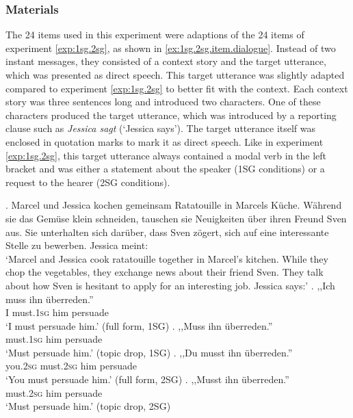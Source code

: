 \subsubsection{Materials}
The 24 items used in this experiment were adaptions of the 24 items of experiment \ref*{exp:1sg.2sg}, as shown in \ref{ex:1sg.2sg.item.dialogue}.
Instead of two instant messages, they consisted of a context story and the target utterance, which was presented as direct speech.
This target utterance was slightly adapted compared to experiment \ref*{exp:1sg.2sg} to better fit with the context.
Each context story was three sentences long and introduced two characters.
One of these characters produced the target utterance, which was introduced by a reporting clause such as \textit{Jessica sagt} (`Jessica says'). 
The target utterance itself was enclosed in quotation marks to mark it as direct speech.
Like in experiment \ref*{exp:1sg.2sg}, this target utterance always contained a modal verb in the left bracket and was either a statement about the speaker (1SG conditions) or a request to the hearer (2SG conditions).

\sloppy
\ex.\label{ex:1sg.2sg.item.dialogue}
Marcel und Jessica kochen gemeinsam Ratatouille in Marcels Küche. Während sie das Gemüse klein schneiden, tauschen sie Neuigkeiten über ihren Freund Sven aus. Sie unterhalten sich darüber, dass Sven zögert, sich auf eine interessante Stelle zu bewerben.	Jessica meint:
\\
`Marcel and Jessica cook ratatouille together in Marcel's kitchen. While they chop the vegetables, they exchange news about their friend Sven. They talk about how Sven is hesitant to apply for an interesting job. Jessica says:'
\ag. ,,Ich muss ihn überreden.''\\
I must.\textsc{1sg} him persuade\\
`I must persuade him.' \hfill (full form, 1SG)
\bg. ,,Muss ihn überreden.''\\
must.\textsc{1sg} him persuade\\
`Must persuade him.' \hfill (topic drop, 1SG)
\cg. ,,Du musst ihn überreden.''\\
you.\textsc{2sg} must.\textsc{2sg} him persuade\\
`You must persuade him.' \hfill (full form, 2SG)
\dg. ,,Musst ihn überreden.''\\
must.\textsc{2sg} him persuade\\
`Must persuade him.' \hfill (topic drop, 2SG)

\fussy


